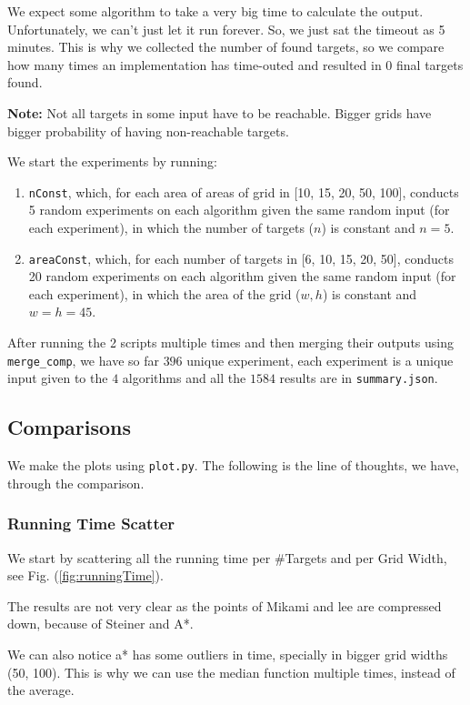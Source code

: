 We expect some algorithm to take a very big time to calculate the output. Unfortunately, we can't just let it run forever. So, we just sat the timeout as 5 minutes. This is why we collected the number of found targets, so we compare how many times an implementation has time-outed and resulted in $0$ final targets found.

\textbf{Note:} Not all targets in some input have to be reachable. Bigger grids have bigger probability of having non-reachable targets.

We start the experiments by running:
\begin{enumerate}
    \item \texttt{nConst}, which, for each area of areas of grid in [10, 15, 20, 50, 100], conducts 5 random experiments on each algorithm given the same random input (for each experiment), in which the number of targets ($n$) is constant and $n = 5$.
    \item \texttt{areaConst}, which, for each number of targets in [6, 10, 15, 20, 50], conducts 20 random experiments on each algorithm given the same random input (for each experiment), in which the area of the grid ($w,h$) is constant and $w = h = 45$.
\end{enumerate}

After running the 2 scripts multiple times and then merging their outputs using \texttt{merge\_comp}, we have so far $396$ unique experiment, each experiment is a unique input given to the $4$ algorithms and all the $1584$ results are in \texttt{summary.json}.

\subsection{Comparisons}
We make the plots using \texttt{plot.py}. The following is the line of thoughts, we have, through the comparison.

\subsubsection{Running Time Scatter}
We start by scattering all the running time per \#Targets and per Grid Width, see Fig. (\ref{fig:runningTime}). 

The results are not very clear as the points of Mikami and lee are compressed down, because of Steiner and A*. 

We can also notice a* has some outliers in time, specially in bigger grid widths (50, 100). This is why we can use the median function multiple times, instead of the average.

